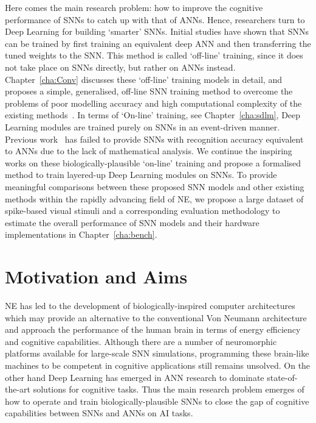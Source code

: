 
Here comes the main research problem: how to improve the cognitive performance of SNNs to catch up with that of ANNs.
Hence, researchers turn to Deep Learning for building `smarter' SNNs.
Initial studies have shown that SNNs can be trained by first training an equivalent deep ANN and then transferring the tuned weights to the SNN.
This method is called `off-line' training, since it does not take place on SNNs directly, but rather on ANNs instead.
Chapter~\ref{cha:Conv} discusses these `off-line' training models in detail, and proposes a simple, generalised, off-line SNN training method to overcome the problems of poor modelling accuracy and high computational complexity of the existing methods~\citep{Jug_etal_2012,hunsberger2015spiking,diehl2015fast}.
In terms of `On-line' training, see Chapter~\ref{cha:sdlm}, Deep Learning modules are trained purely on SNNs in an event-driven manner.
Previous work~\citep{neil2013online,neftci2013event,burbank2015mirrored} has failed to provide SNNs with recognition accuracy equivalent to ANNs due to the lack of mathematical analysis.
We continue the inspiring works on these biologically-plausible `on-line' training and propose a formalised method to train layered-up Deep Learning modules on SNNs.
To provide meaningful comparisons between these proposed SNN models and other existing methods within the rapidly advancing field of NE, we propose a large dataset of spike-based visual stimuli and a corresponding evaluation methodology to estimate the overall performance of SNN models and their hardware implementations in Chapter~\ref{cha:bench}.

\section{Motivation and Aims}
\label{sec:state_problem}
NE has led to the development of biologically-inspired computer architectures which may provide an alternative to the conventional Von Neumann architecture and approach the performance of the human brain in terms of energy efficiency and cognitive capabilities.
Although there are a number of neuromorphic platforms available for large-scale SNN simulations, programming these brain-like machines to be competent in cognitive applications still remains unsolved.
On the other hand Deep Learning has emerged in ANN research to dominate state-of-the-art solutions for cognitive tasks.
Thus the main research problem emerges of how to operate and train biologically-plausible SNNs to close the gap of cognitive capabilities between SNNs and ANNs on AI tasks.

